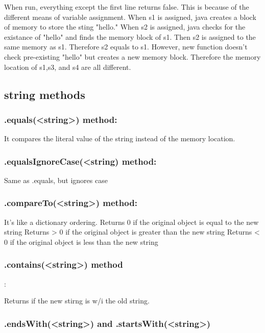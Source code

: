 \documentclass [12 pt, twoside] {article}
\begin{document}
When run, everything except the first line returns false.
This is because of the different means of variable assignment.
When s1 is assigned, java creates a block of memory to store the sting "hello."
When s2 is assigned, java checks for the existance of "hello" and finds the memory block of s1.
Then s2 is assigned to the same memory as s1.
Therefore s2 equals to s1.
However, new function doesn't check pre-existing "hello" but creates a new memory block.
Therefore the memory location of s1,s3, and s4 are all different.


\subsection{string methods}
\subsubsection{.equals(<string>) method:}


It compares the literal value of the string instead of the memory location.


\subsubsection{.equalsIgnoreCase(<string) method:}


Same as .equals, but ignores case


\subsubsection{.compareTo(<string>) method:}


It's like a dictionary ordering.
Returns 0 if the original object is equal to the new string
\newline
Returns > 0 if the original object is greater than the new string
\newline
Returns < 0 if the original object is less than the new string


\subsubsection{.contains(<string>) method}:


Returns if the new stirng is w/i the old string.


\subsubsection{.endsWith(<string>) and .startsWith(<string>)}
\end{document}
